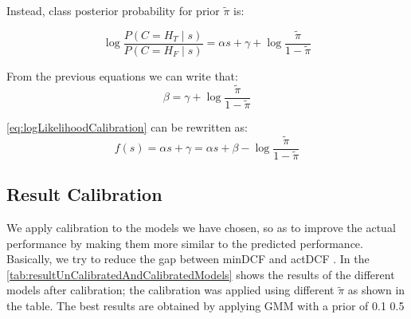Instead, class posterior probability for prior \(\tilde{\pi}\) is:

\begin{equation}
    \log {\frac{P(C=H_T\mid s)}{P(C=H_F\mid s)}} = \alpha s + \gamma + \log \frac{\tilde{\pi}}{1 - \tilde{\pi}}
    \label{eq:posteriorProbability}
\end{equation}

From the previous equations we can write that:
\begin{equation}
    \beta = \gamma + \log \frac{\tilde{\pi}}{1 - \tilde{\pi}}
    \label{eq:beta}
\end{equation}

\autoref{eq:logLikelihoodCalibration} can be rewritten as:
\begin{equation}
    f(s) = \alpha s + \gamma = \alpha s + \beta - \log \frac{\tilde{\pi}}{1 - \tilde{\pi}}
    \label{eq:logLikelihoodCalibrationBeta}
\end{equation}

\subsection{Result Calibration}
\label{subsec:resultCalibration}
We apply calibration to the models we have chosen, so as to improve the actual performance by making them more similar
to the predicted performance.
Basically, we try to reduce the gap between minDCF and actDCF .
In the \autoref{tab:resultUnCalibratedAndCalibratedModels} shows the results of the different models after calibration;
the calibration was applied using different \(\tilde{\pi}\) as shown in the table.
The best results are obtained by applying GMM with a prior of 0.1 0.5


